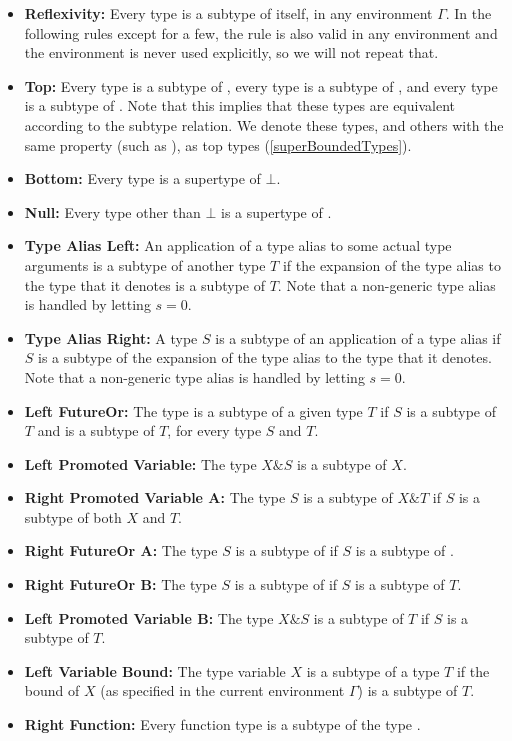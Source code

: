 \documentclass[makeidx]{article}
\begin{document}
{{\def\Item#1#2{\item[#1]{\textbf{#2:}}}
\begin{itemize}
\Item{\SrnReflexivity}{Reflexivity}
  Every type is a subtype of itself, in any environment $\Gamma$.
  In the following rules except for a few,
  the rule is also valid in any environment
  and the environment is never used explicitly,
  so we will not repeat that.
\Item{\SrnTop}{Top}
  Every type is a subtype of ,
  every type is a subtype of \DYNAMIC{},
  and every type is a subtype of \VOID{}.
  Note that this implies that these types are equivalent
  according to the subtype relation.
  We denote these types,
  and others with the same property (such as ),
  as top types
  (\ref{superBoundedTypes}).
\Item{\SrnBottom}{Bottom}
  Every type is a supertype of $\bot$.
\Item{\SrnNull}{Null}
  Every type other than $\bot$ is a supertype of .
\Item{\SrnLeftTypeAlias}{Type Alias Left}
  An application of a type alias to some actual type arguments is
  a subtype of another type $T$
  if the expansion of the type alias to the type that it denotes
  is a subtype of $T$.
  Note that a non-generic type alias is handled by letting $s = 0$.
\Item{\SrnRightTypeAlias}{Type Alias Right}
  A type $S$ is a subtype of an application of a type alias
  if $S$ is a subtype of
  the expansion of the type alias to the type that it denotes.
  Note that a non-generic type alias is handled by letting $s = 0$.
\Item{\SrnLeftFutureOr}{Left FutureOr}
  The type  is a subtype of a given type $T$
  if $S$ is a subtype of $T$ and  is a subtype of $T$,
  for every type $S$ and $T$.
\Item{\SrnTypeVariableReflexivityA}{Left Promoted Variable}
  The type $X \& S$ is a subtype of $X$.
\Item{\SrnRightPromotedVariable}{Right Promoted Variable A}
  The type $S$ is a subtype of $X \& T$ if
  $S$ is a subtype of both $X$ and $T$.
\Item{\SrnRightFutureOrA}{Right FutureOr A}
  The type $S$ is a subtype of  if
  $S$ is a subtype of .
\Item{\SrnRightFutureOrB}{Right FutureOr B}
  The type $S$ is a subtype of  if
  $S$ is a subtype of $T$.
\Item{\SrnLeftPromotedVariable}{Left Promoted Variable B}
  The type $X \& S$ is a subtype of $T$ if
  $S$ is a subtype of $T$.
\Item{\SrnLeftVariableBound}{Left Variable Bound}
  The type variable $X$ is a subtype of a type $T$ if
  the bound of $X$
  (as specified in the current environment $\Gamma$)
  is a subtype of $T$.
\Item{\SrnRightFunction}{Right Function}
  Every function type is a subtype of the type \FUNCTION{}.

\end{itemize}}}
\end{document}
